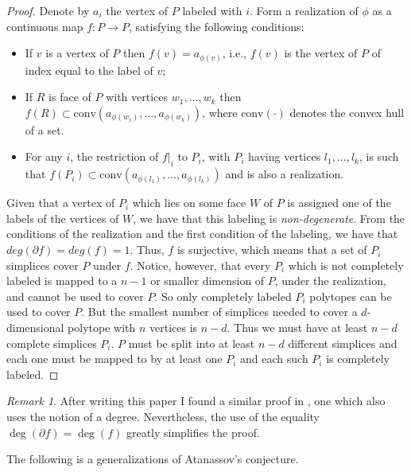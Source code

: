 \documentclass[11pt]{amsart}
\theoremstyle{definition}
\theoremstyle{remark}
\newtheorem{rem}[thm]{Remark}
\numberwithin{equation}{section}
\theoremstyle{definition}
\begin{document}
	\begin{proof} 
		
		Denote by $a_i$ the vertex of $P$ labeled with $i$. Form a realization of $\phi$ as a continuous map $f: P \to P$, satisfying the following conditions:
		\begin{itemize}
			\item If $v$ is a vertex of $P$ then $f(v)=a_{\phi(v)}$, i.e., $f(v)$ is the vertex of $P$ of index equal to the label of $v$;
			\item If $R$ is face of $P$ with vertices $w_1,\ldots,w_k$ then $f(R)\subset \textrm{conv}(a_{\phi(w_1)},\ldots, a_{\phi(w_k)})$, where $\textrm{conv}(\cdot)$ denotes the convex hull of a set.
			\item For any $i$, the restriction of $f|_i$ to $P_i$, with $P_i$ having vertices $l_1,\ldots,l_k$, is such that $f(P_i) \subset \textrm{conv}(a_{\phi(l_1)},\ldots, a_{\phi(l_k)})$ and is also a realization.
		\end{itemize}
		
		
		
		
		Given that a vertex of $P_i$ which lies on some face $W$ of $P$ is assigned one of the labels of  the vertices of $W$, we have that this labeling is \emph{non-degenerate}. From the conditions of the realization and the first condition of the labeling, we have that $deg(\partial f) = deg(f) = 1$. Thus, $f$ is surjective, which means that a set of $P_i$ simplices cover $P$ under $f$. Notice, however, that every $P_i$ which is not completely labeled is mapped to a $n-1$ or smaller dimension of $P$, under the realization, and cannot be used to cover $P$. So only completely labeled $P_i$ polytopes can be used to cover $P$. But the smallest number of  simplices needed to cover a $d$-dimensional polytope with $n$ vertices is $n-d$. Thus we must have at least $n-d$ complete simplices $P_i$. $P$ must be split into at least $n-d$ different simplices and each one must be mapped to by at least one $P_i$ and each such $P_i$ is completely labeled.   
		
	\end{proof}
	
	\begin{rem}
		After writing this paper I found a similar proof in \cite{Musin}, one which also uses the notion of a degree. Nevertheless, the use of the equality $\deg(\partial f) = \deg(f)$ greatly simplifies the proof.   
	\end{rem}
	
	
	The following is a generalizations of Atanassov's conjecture.
	
\end{document}
